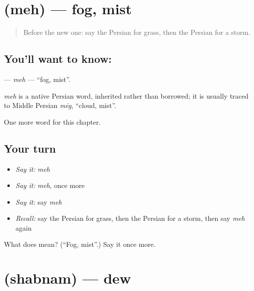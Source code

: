 \section[\texorpdfstring{\fa{مه} (meh)}{مه (meh)}]{ (meh) — fog, mist}

\label{lesson:FA-C104-meh}



\begin{quote}
Before the new one: say the Persian for grass, then the Persian for a storm.
\end{quote}

\subsection*{You'll want to know: }
\textbf{} — \emph{meh} — \textquotedblleft{}fog, mist\textquotedblright{}.

\begin{cousinweb}
\emph{meh} is a native Persian word, inherited rather than borrowed; it is usually traced to Middle Persian \emph{mēg}, \textquotedblleft{}cloud, mist\textquotedblright{}.
\end{cousinweb}

\begin{grammarlens}[title={What you've built}]
One more word for this chapter.
\end{grammarlens}

\subsection*{Your turn}
\begin{itemize}
\raggedright
  \item \emph{Say it:} \emph{meh}
  \item \emph{Say it:} \emph{meh}, once more
  \item \emph{Say it:} say \emph{meh}
  \item \emph{Recall:} say the Persian for grass, then the Persian for a storm, then say \emph{meh} again
\end{itemize}

\begin{tcolorbox}[breakable,colback=teal!4,colframe=teal!35!black,title={Before you move on}]
What does  mean? (\textquotedblleft{}Fog, mist\textquotedblright{}.) Say it once more.
\end{tcolorbox}
\section[\texorpdfstring{\fa{شبنم} (shabnam)}{شبنم (shabnam)}]{ (shabnam) — dew}

